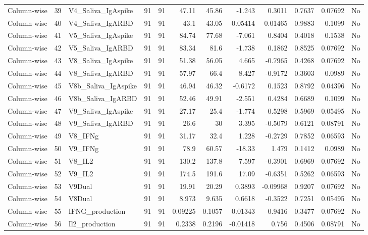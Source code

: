 \begin{longtable}{lrp{}rrrrrrrrl}
Column-wise & 39 & V4\_Saliva\_IgAspike & 91 & 91 & 47.11 & 45.86 & -1.243 & 0.3011 & 0.7637 & 0.07692 & No \\
Column-wise & 40 & V4\_Saliva\_IgARBD & 91 & 91 & 43.1 & 43.05 & -0.05414 & 0.01465 & 0.9883 & 0.1099 & No \\
Column-wise & 41 & V5\_Saliva\_IgAspike & 91 & 91 & 84.74 & 77.68 & -7.061 & 0.8404 & 0.4018 & 0.1538 & No \\
Column-wise & 42 & V5\_Saliva\_IgARBD & 91 & 91 & 83.34 & 81.6 & -1.738 & 0.1862 & 0.8525 & 0.07692 & No \\
Column-wise & 43 & V8\_Saliva\_IgAspike & 91 & 91 & 51.38 & 56.05 & 4.665 & -0.7965 & 0.4268 & 0.07692 & No \\
Column-wise & 44 & V8\_Saliva\_IgARBD & 91 & 91 & 57.97 & 66.4 & 8.427 & -0.9172 & 0.3603 & 0.0989 & No \\
Column-wise & 45 & V8b\_Saliva\_IgAspike & 91 & 91 & 46.94 & 46.32 & -0.6172 & 0.1523 & 0.8792 & 0.04396 & No \\
Column-wise & 46 & V8b\_Saliva\_IgARBD & 91 & 91 & 52.46 & 49.91 & -2.551 & 0.4284 & 0.6689 & 0.1099 & No \\
Column-wise & 47 & V9\_Saliva\_IgAspike & 91 & 91 & 27.17 & 25.4 & -1.774 & 0.5298 & 0.5969 & 0.05495 & No \\
Column-wise & 48 & V9\_Saliva\_IgARBD & 91 & 91 & 26.6 & 30 & 3.395 & -0.5079 & 0.6121 & 0.08791 & No \\
Column-wise & 49 & V8\_IFNg & 91 & 91 & 31.17 & 32.4 & 1.228 & -0.2729 & 0.7852 & 0.06593 & No \\
Column-wise & 50 & V9\_IFNg & 91 & 91 & 78.9 & 60.57 & -18.33 & 1.479 & 0.1412 & 0.0989 & No \\
Column-wise & 51 & V8\_IL2 & 91 & 91 & 130.2 & 137.8 & 7.597 & -0.3901 & 0.6969 & 0.07692 & No \\
Column-wise & 52 & V9\_IL2 & 91 & 91 & 174.5 & 191.6 & 17.09 & -0.6351 & 0.5262 & 0.06593 & No \\
Column-wise & 53 & V9Dual & 91 & 91 & 19.91 & 20.29 & 0.3893 & -0.09968 & 0.9207 & 0.07692 & No \\
Column-wise & 54 & V8Dual & 91 & 91 & 8.973 & 9.635 & 0.6618 & -0.3522 & 0.7251 & 0.05495 & No \\
Column-wise & 55 & IFNG\_production & 91 & 91 & 0.09225 & 0.1057 & 0.01343 & -0.9416 & 0.3477 & 0.07692 & No \\
Column-wise & 56 & Il2\_production & 91 & 91 & 0.2338 & 0.2196 & -0.01418 & 0.756 & 0.4506 & 0.08791 & No \\

\end{longtable}
